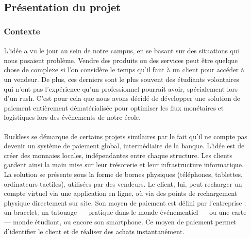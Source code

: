 \subsection{Présentation du projet}
    \subsubsection{Contexte}
        \paragraph{}
            L'idée a vu le jour au sein de notre campus, en se basant sur des situations qui nous posaient problème.
            Vendre des produits ou des services peut être quelque chose de complexe si l’on considère le temps
            qu’il faut à un client pour accéder à un vendeur. De plus, ces derniers sont le plus souvent des étudiants
            volontaires qui n’ont pas l’expérience qu’un professionnel pourrait avoir, spécialement lors d’un rush.
            C’est pour cela que nous avons décidé de développer une solution de paiement entièrement dématérialisée
            pour optimiser les flux monétaires et logistiques lors des événements de notre école.

        \paragraph{}
            Buckless se démarque de certains projets similaires par le fait qu’il ne compte pas devenir un système
            de paiement global, intermédiaire de la banque. L'idée est de créer des monnaies locales, indépendantes
            entre chaque structure. Les clients gardent ainsi la main mise sur leur trésorerie et leur infrastructure
            informatique.
            La solution se présente sous la forme de bornes physiques (téléphones, tablettes, ordinateurs tactiles),
            utilisées par des vendeurs. Le client, lui, peut recharger un compte virtuel via une application en ligne,
            où via des points de rechargement physique directement sur site. Son moyen de paiement est défini par l'entreprise :
            un bracelet, un tatouage — pratique dans le monde événementiel — ou une carte — monde étudiant, ou encore
            son smartphone. Ce moyen de paiement permet d'identifier le client et de réaliser des achats instantanément.

